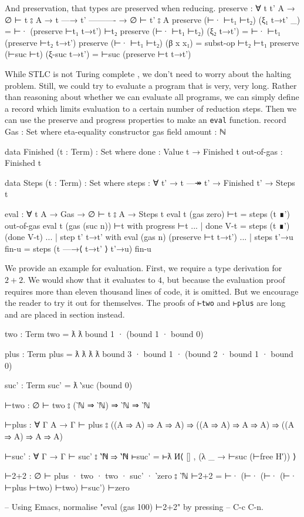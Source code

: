 \documentclass[logo,bsc,singlespacing,parskip,online]{infthesis}
\renewenvironment{code}{\mintedcopy[breaklines,breaksymbolleft=\;]{agda}}{\endmintedcopy}
\begin{document}
And preservation, that types are preserved when reducing.
\begin{code}
preserve : ∀ {t t' A}
  → ∅ ⊢ t ⦂ A
  → t —→ t'
    ----------
  → ∅ ⊢ t' ⦂ A
preserve (⊢· ⊢t₁ ⊢t₂) (ξ₁ t→t' _) = ⊢· (preserve ⊢t₁ t→t') ⊢t₂
preserve (⊢· ⊢t₁ ⊢t₂) (ξ₂ t→t') = ⊢· ⊢t₁  (preserve ⊢t₂ t→t')
preserve (⊢· ⊢t₁ ⊢t₂) (β x x₁) = subst-op ⊢t₂ ⊢t₁
preserve (⊢suc ⊢t) (ξ-suc t→t') = ⊢suc (preserve ⊢t t→t')
\end{code}

While STLC is not Turing complete \citep{church_formulation_1940}, we don't need to worry about the
halting problem. Still, we could try to evaluate a program that is very, very long. Rather than
reasoning about whether we can evaluate all programs, we can simply define a record which limits
evaluation to a certain number of reduction steps. Then we can use the preserve and progress
properties to make an \texttt{eval} function.
\begin{code}
record Gas : Set where
  eta-equality
  constructor gas
  field
    amount : ℕ

data Finished (t : Term) : Set where
  done : Value t → Finished t
  out-of-gas : Finished t

data Steps (t : Term) : Set where
  steps : ∀ {t'} → t —↠ t' → Finished t' → Steps t

eval : ∀ {t A} → Gas → ∅ ⊢ t ⦂ A → Steps t
eval {t} (gas zero) ⊢t = steps (t ∎') out-of-gas
eval {t} (gas (suc n)) ⊢t with progress ⊢t
... | done V-t = steps (t ∎') (done V-t)
... | step {t'} t→t' with eval (gas n) (preserve ⊢t t→t')
...   | steps t'→u fin-u = steps (t —→⟨ t→t' ⟩ t'→u) fin-u
\end{code}

We provide an example for evaluation. First, we require a type derivation for $2+2$. We would show
that it evaluates to $4$, but because the evaluation proof requires more than eleven thousand lines
of code, it is omitted. But we encourage the reader to try it out for themselves. The proofs of
\texttt{⊢two} and \texttt{⊢plus} are long and are placed in section instead.

\begin{code}
two : Term
two = ƛ ƛ bound 1 · (bound 1 · bound 0)

plus : Term
plus = ƛ ƛ ƛ ƛ bound 3 · bound 1 · (bound 2 · bound 1 · bound 0)

suc' : Term
suc' = ƛ ‵suc (bound 0)

⊢two : ∅ ⊢ two ⦂ (‵ℕ ⇒ ‵ℕ) ⇒ ‵ℕ ⇒ ‵ℕ

⊢plus : ∀ {Γ A} → Γ ⊢ plus ⦂
  ((A ⇒ A) ⇒ A ⇒ A) ⇒ ((A ⇒ A) ⇒ A ⇒ A) ⇒ ((A ⇒ A) ⇒ A ⇒ A)

⊢suc' : ∀ {Γ} → Γ ⊢ suc' ⦂ ‵ℕ ⇒ ‵ℕ
⊢suc' = ⊢ƛ И⟨ [] , (λ _ → ⊢suc (⊢free H′)) ⟩

⊢2+2 : ∅ ⊢ plus · two · two · suc' · ‵zero ⦂ ‵ℕ
⊢2+2 = ⊢· (⊢· (⊢· (⊢· ⊢plus  ⊢two) ⊢two) ⊢suc') ⊢zero

-- Using Emacs, normalise "eval (gas 100) ⊢2+2" by pressing
-- C-c C-n.
\end{code}
\end{document}
